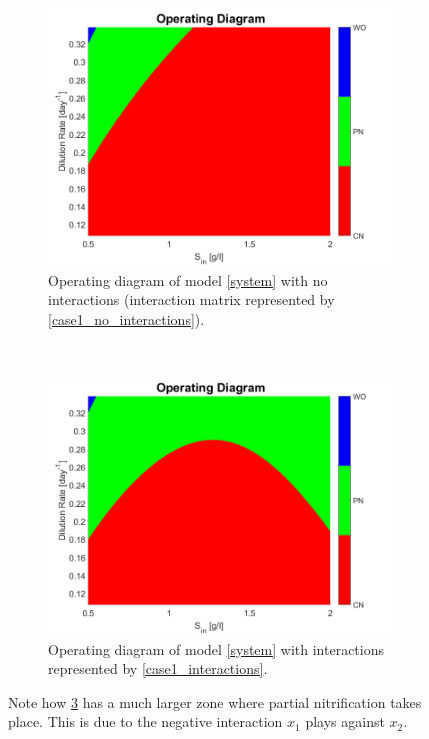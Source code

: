 \documentclass[3p,times]{article}
\begin{document}
\begin{figure}[h]
	\centering
	\begin{subfigure}[b]{0.45\textwidth}
		\includegraphics[width = \textwidth]{Stability/OD_case_study_1_no_interactions}
		\caption{Operating diagram of model \eqref{system} with no interactions (interaction matrix represented by \eqref{case1_no_interactions}).}
		\label{OD_no_interactions}
	\end{subfigure}
~
	\begin{subfigure}[b]{0.45\textwidth}
	\includegraphics[width = \textwidth]{Stability/OD_case_study_1}
	\caption{Operating diagram of model \eqref{system} with interactions represented by \eqref{case1_interactions}.}
	\label{OD_interactions}
	\end{subfigure}
	\caption{Note how \ref{OD_interactions} has a much larger zone where partial nitrification takes place. This is due to the negative interaction $x_1$ plays against $x_2$.}
\end{figure} 
\clearpage
\end{document}
